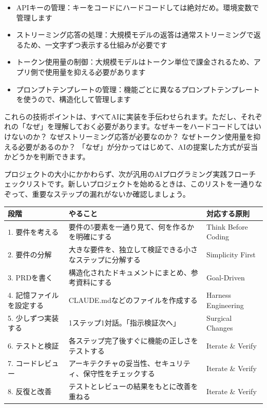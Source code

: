 \begin{itemize}
  \item APIキーの管理：キーをコードにハードコードしては絶対だめ。環境変数で管理します
  \item ストリーミング応答の処理：大規模モデルの返答は通常ストリーミングで返るため、一文字ずつ表示する仕組みが必要です
  \item トークン使用量の制御：大規模モデルはトークン単位で課金されるため、アプリ側で使用量を抑える必要があります
  \item プロンプトテンプレートの管理：機能ごとに異なるプロンプトテンプレートを使うので、構造化して管理します
\end{itemize}

これらの技術ポイントは、すべてAIに実装を手伝わせられます。ただし、それぞれの「なぜ」を理解しておく必要があります。なぜキーをハードコードしてはいけないのか？ なぜストリーミング応答が必要なのか？ なぜトークン使用量を抑える必要があるのか？ 「なぜ」が分かってはじめて、AIの提案した方式が妥当かどうかを判断できます。


プロジェクトの大小にかかわらず、次が汎用のAIプログラミング実践フローチェックリストです。新しいプロジェクトを始めるときは、このリストを一通りなぞって、重要なステップの漏れがないか確認しましょう。

\begin{center}
\begin{tabularx}{\linewidth}{|X|X|X|}
\hline
\textbf{段階} & \textbf{やること} & \textbf{対応する原則} \tabularnewline
\hline
1. 要件を考える & 要件の5要素を一通り見て、何を作るかを明確にする & Think Before Coding \tabularnewline
2. 要件の分解 & 大きな要件を、独立して検証できる小さなステップに分解する & Simplicity First \tabularnewline
3. PRDを書く & 構造化されたドキュメントにまとめ、参考資料にする & Goal-Driven \tabularnewline
4. 記憶ファイルを設定する & CLAUDE.mdなどのファイルを作成する & Harness Engineering \tabularnewline
5. 少しずつ実装する & 1ステップ1対話。「指示検証次へ」 & Surgical Changes \tabularnewline
6. テストと検証 & 各ステップ完了後すぐに機能の正しさをテストする & Iterate \& Verify \tabularnewline
7. コードレビュー & アーキテクチャの妥当性、セキュリティ、保守性をチェックする & Iterate \& Verify \tabularnewline
8. 反復と改善 & テストとレビューの結果をもとに改善を重ねる & Iterate \& Verify \tabularnewline
\hline
\end{tabularx}
\end{center}

